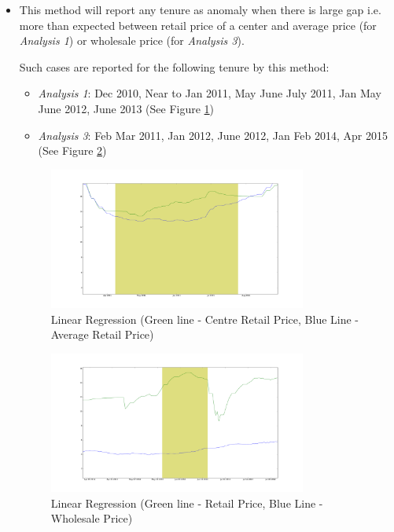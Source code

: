 \documentclass[a4paper,10pt]{report}
\begin{document}
		\begin{itemize}
			\item This method will report any tenure as anomaly when there is large gap i.e. more than expected between retail price of a center and average price (for \textit{Analysis 1}) or wholesale price (for \textit{Analysis 3}).
			
			
			
			Such cases are reported for the following tenure by this method:
			\begin{itemize}
				\item \textit{Analysis 1}: Dec 2010, Near to Jan 2011, May June July 2011, Jan May June 2012, June 2013 (See Figure \ref{fig:12211})
				\item \textit{Analysis 3}: Feb Mar 2011, Jan 2012, June 2012, Jan Feb 2014, Apr 2015 (See Figure \ref{fig:12231})
			\end{itemize}
			\begin{figure}[H]
		    	\centering
  		    	\includegraphics[width=0.8\textwidth]{graphs/12211.png}
		    	\caption{Linear Regression (Green line - Centre Retail Price, Blue Line - Average Retail Price)}
		    	\label{fig:12211}
			\end{figure}
			
			\begin{figure}[H]
		    	\centering
  		    	\includegraphics[width=0.8\textwidth]{graphs/12231.png}
		    	\caption{Linear Regression (Green line - Retail Price, Blue Line - Wholesale Price)}
		    	\label{fig:12231}
			\end{figure}
			

\end{itemize}
\end{document}

